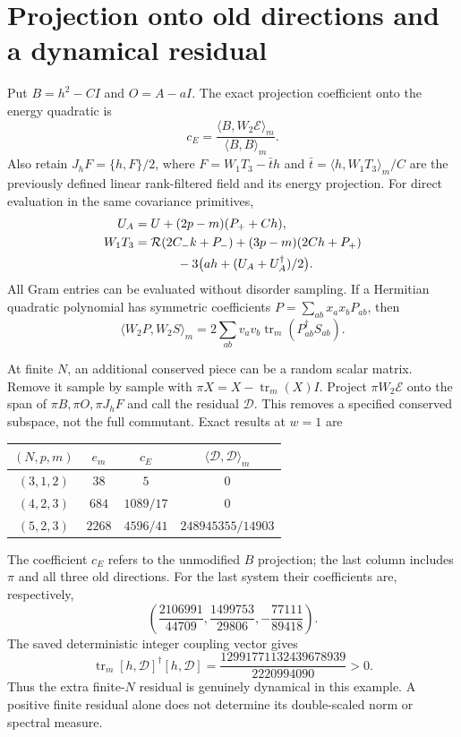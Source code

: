 \documentclass[11pt,a4paper]{article}
\newcommand{\rr}{\mathcal R}
\newcommand{\core}{\mathcal E}
\DeclareMathOperator{\tr}{tr}
\begin{document}
\newpage
\section{Projection onto old directions and a dynamical residual}
Put $B=h^2-CI$ and $O=A-aI$. The exact projection coefficient
onto the energy quadratic is
\begin{equation}
 c_E=\frac{\langle B,W_2\core\rangle_m}{\langle B,B\rangle_m}.
\end{equation}
Also retain $J_hF=\{h,F\}/2$, where
$F=W_1T_3-\bar t h$ and $\bar t=\langle h,W_1T_3\rangle_m/C$
are the previously defined linear rank-filtered field and its energy
projection. For direct evaluation in the same covariance primitives,
\begin{align}
 U_A&=U+(2p-m)(P_++Ch),\\
 W_1T_3&=\rr(2C_-k+P_-)+(3p-m)(2Ch+P_+)\nonumber\\
 &\hspace{12mm}-3\big(ah+(U_A+U_A^\dagger)/2\big).
\end{align}
All Gram entries can be evaluated without disorder sampling.
If a Hermitian quadratic polynomial has symmetric coefficients
$P=\sum_{ab}x_ax_bP_{ab}$, then
\begin{equation}
 \langle W_2P,W_2S\rangle_m
       =2\sum_{ab}v_av_b\tr_m(P_{ab}^\dagger S_{ab}).
 \label{eq:gram}
\end{equation}

At finite $N$, an additional conserved piece can be a random scalar
matrix. Remove it sample by sample with
$\pi X=X-\tr_m(X)I$. Project $\pi W_2\core$ onto the span of
$\pi B,\pi O,\pi J_hF$ and call the residual $\mathcal D$.
This removes a specified conserved subspace, not the full commutant.
Exact results at $w=1$ are
\begin{center}
\begin{tabular}{cccc}
\toprule
$(N,p,m)$ & $e_m$ & $c_E$ & $\langle\mathcal D,\mathcal D\rangle_m$\\
\midrule
$(3,1,2)$ & $38$ & $5$ & $0$\\
$(4,2,3)$ & $684$ & $1089/17$ & $0$\\
$(5,2,3)$ & $2268$ & $4596/41$ & $248945355/14903$\\
\bottomrule
\end{tabular}
\end{center}
The coefficient $c_E$ refers to the unmodified $B$ projection;
the last column includes $\pi$ and all three old directions.
For the last system their coefficients are, respectively,
\begin{equation}
 \left(\frac{2106991}{44709},\frac{1499753}{29806},
                 -\frac{77111}{89418}\right).
\end{equation}
The saved deterministic integer coupling vector gives
\begin{equation}
 \tr_m[h,\mathcal D]^\dagger[h,\mathcal D]
        =\frac{12991771132439678939}{2220994090}>0.
\end{equation}
Thus the extra finite-$N$ residual is genuinely dynamical in this
example. A positive finite residual alone does not determine its
double-scaled norm or spectral measure.
\end{document}
